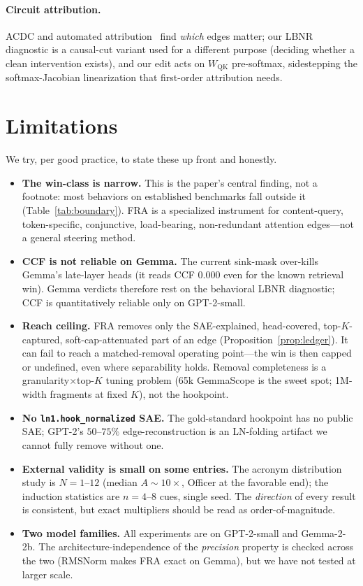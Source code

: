 \documentclass[11pt]{article}
\newcommand{\QK}{\mathrm{QK}}
\theoremstyle{definition}
\theoremstyle{plain}
\theoremstyle{remark}
\begin{document}
\paragraph{Circuit attribution.} ACDC and automated attribution~\citep{conmy2023acdc} find \emph{which} edges matter; our LBNR diagnostic is a causal-cut variant used for a different purpose (deciding whether a clean intervention exists), and our edit acts on $W_{\QK}$ pre-softmax, sidestepping the softmax-Jacobian linearization that first-order attribution needs.

\section{Limitations}\label{sec:limitations}

We try, per good practice, to state these up front and honestly.

\begin{itemize}[leftmargin=1.4em,itemsep=3pt]
  \item \textbf{The win-class is narrow.} This is the paper's central finding, not a footnote: most behaviors on established benchmarks fall outside it (Table~\ref{tab:boundary}). FRA is a specialized instrument for content-query, token-specific, conjunctive, load-bearing, non-redundant attention edges---not a general steering method.
  \item \textbf{CCF is not reliable on Gemma.} The current sink-mask over-kills Gemma's late-layer heads (it reads CCF $0.000$ even for the known retrieval win). Gemma verdicts therefore rest on the behavioral LBNR diagnostic; CCF is quantitatively reliable only on GPT-2-small.
  \item \textbf{Reach ceiling.} FRA removes only the SAE-explained, head-covered, top-$K$-captured, soft-cap-attenuated part of an edge (Proposition~\ref{prop:ledger}). It can fail to reach a matched-removal operating point---the win is then capped or undefined, even where separability holds. Removal completeness is a granularity$\times$top-$K$ tuning problem (65k GemmaScope is the sweet spot; 1M-width fragments at fixed $K$), not the hookpoint.
  \item \textbf{No \texttt{ln1.hook\_normalized} SAE.} The gold-standard hookpoint has no public SAE; GPT-2's $50$--$75\%$ edge-reconstruction is an LN-folding artifact we cannot fully remove without one.
  \item \textbf{External validity is small on some entries.} The acronym distribution study is $N{=}1$--$12$ (median $A{\sim}10\times$, Officer at the favorable end); the induction statistics are $n{=}4$--$8$ cues, single seed. The \emph{direction} of every result is consistent, but exact multipliers should be read as order-of-magnitude.
  \item \textbf{Two model families.} All experiments are on GPT-2-small and Gemma-2-2b. The architecture-independence of the \emph{precision} property is checked across the two (RMSNorm makes FRA exact on Gemma), but we have not tested at larger scale.
\end{itemize}
\end{document}
